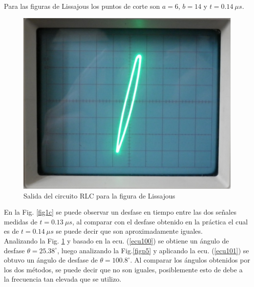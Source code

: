 \documentclass[twocolumn]{IEEEtran}
\begin{document}
Para las figuras de Lissajous los puntos de corte son $a = 6$, $b= 14$ y $t=0.14\ \mu s$.
\begin{figure}[H]
	\centering
		\includegraphics[scale=0.13]{237.png}
	\caption{Salida del circuito RLC para la figura de Lissajous}
	\label{figp6}
\end{figure}
\noindent
En la Fig. \ref{fig1c} se puede observar un desfase en tiempo entre las dos señales medidas de $t=0.13\ \mu s$, al comparar con el desfase obtenido en la práctica el cual es de $t=0.14\ \mu s$ se puede decir que son aproximadamente iguales.\\
Analizando la Fig. \ref{figp6} y basado en la ecu. (\ref{ecu100}) se obtiene un ángulo de desfase $\theta = 25.38 ^\circ$, luego analizando la Fig.\ref{figp5} y aplicando la ecu. (\ref{ecu101}) se obtuvo un ángulo de desfase de $\theta = 100.8 ^\circ$. Al comparar los ángulos obtenidos por los dos métodos, se puede decir que  no son iguales, posiblemente esto de debe a la frecuencia tan elevada que se utilizo.
\end{document}
